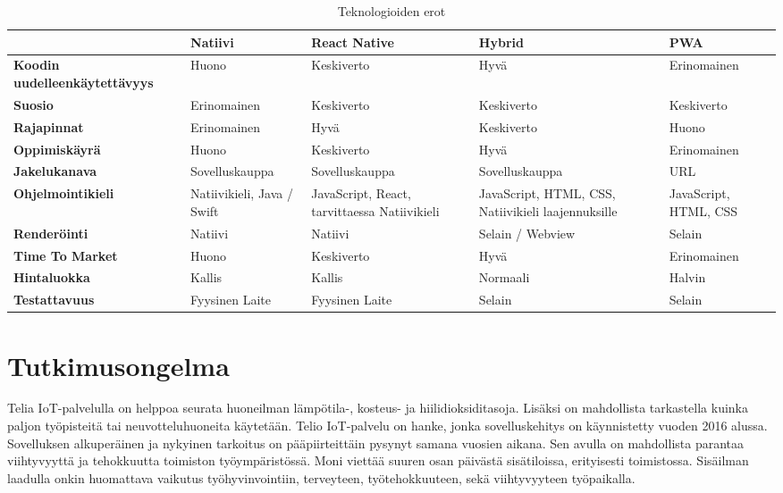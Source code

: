\documentclass{tktltiki}
\begin{document}
\begin{landscape}
\begin{table}[!ht]
\centering
\begin{small}
\caption{ Teknologioiden erot }
\begin{tabular}{|L{4cm}|L{4cm}|L{4cm}|L{4cm}| L{4cm}|}
\hline
\textbf{} &
\textbf{Natiivi} & 
\textbf{React Native} &
\textbf{Hybrid} & 
\textbf{PWA}
\\ \hline
\textbf{Koodin uudelleenkäytettävyys} & Huono &	Keskiverto & Hyvä & Erinomainen
\\ \hline
\textbf{Suosio} & Erinomainen & Keskiverto & Keskiverto & Keskiverto
\\ \hline
\textbf{Rajapinnat} & Erinomainen &	Hyvä & Keskiverto &	Huono
\\ \hline
\textbf{Oppimiskäyrä} & Huono &	Keskiverto & Hyvä &	Erinomainen
\\ \hline
\textbf{Jakelukanava} & Sovelluskauppa & Sovelluskauppa & Sovelluskauppa & URL
\\ \hline
\textbf{Ohjelmointikieli} & Natiivikieli, Java / Swift & JavaScript, React, tarvittaessa Natiivikieli &	JavaScript, HTML, CSS, Natiivikieli laajennuksille & JavaScript, HTML, CSS
\\ \hline
\textbf{Renderöinti} & Natiivi & Natiivi & Selain / Webview & Selain
\\ \hline
\textbf{Time To Market} & Huono	& Keskiverto & Hyvä & Erinomainen
\\ \hline
\textbf{Hintaluokka} & Kallis &	Kallis & Normaali &	Halvin
\\ \hline
\textbf{Testattavuus} & Fyysinen Laite & Fyysinen Laite & Selain & Selain
\\ \hline
\end{tabular}
\label{table:ExampleTable2}
\end{small}
\end{table}

\end{landscape}

\newpage
\section{Tutkimusongelma}

Telia IoT-palvelulla on helppoa seurata huoneilman lämpötila-, kosteus- ja hiilidioksiditasoja. Lisäksi on mahdollista tarkastella kuinka paljon työpisteitä tai neuvotteluhuoneita käytetään. Telio IoT-palvelu on hanke, jonka sovelluskehitys on käynnistetty vuoden 2016 alussa. Sovelluksen alkuperäinen ja nykyinen tarkoitus on pääpiirteittäin pysynyt samana vuosien aikana. Sen avulla on mahdollista parantaa viihtyvyyttä ja tehokkuutta toimiston työympäristössä. Moni viettää suuren osan päivästä sisätiloissa, erityisesti toimistossa. Sisäilman laadulla onkin huomattava vaikutus työhyvinvointiin, terveyteen, työtehokkuuteen, sekä viihtyvyyteen työpaikalla. 
\end{document}
